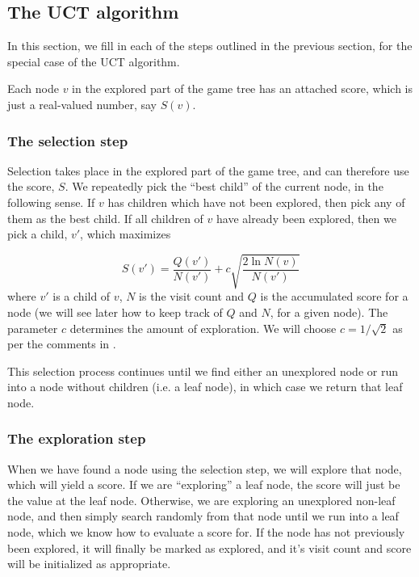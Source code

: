 \subsection{The UCT algorithm}
\label{sec:uct}

In this section, we fill in each of the steps outlined in the previous section, for the special case of the UCT algorithm.

Each node $v$ in the explored part of the game tree has an attached score, which is just a real-valued number, say $S(v)$.


\subsubsection{The selection step}
\label{subsec:uct_selection_step}

Selection takes place in the explored part of the game tree, and can therefore use the score, $S$.
We repeatedly pick the ``best child'' of the current node, in the following sense.
If $v$ has children which have not been explored, then pick any of them as the best child.
If all children of $v$ have already been explored, then we pick a child, $v'$, which maximizes

\begin{equation}
\label{eq:uctnodevalue}
S(v') = \frac{Q(v')}{N(v')} + c\sqrt{\frac{2\ln{N(v)}}{N(v')}}
\end{equation} 
where $v'$ is a child of $v$, $N$ is the visit count and $Q$ is the accumulated score for a node (we will see later how to keep track of $Q$ and $N$, for a given node).
The parameter $c$ determines the amount of exploration. We will choose $c = 1 / \sqrt 2$ as per the comments in \citep[p. 9]{mcts_survey12}.

This selection process continues until we find either an unexplored node or run into a node without children (i.e. a leaf node), in which case we return that leaf node.

\subsubsection{The exploration step}

When we have found a node using the selection step, we will explore that node, which will yield a score.
If we are ``exploring'' a leaf node, the score will just be the value at the leaf node.
Otherwise, we are exploring an unexplored non-leaf node, and then simply search randomly from that node until we run into a leaf node, which we know how to evaluate a score for.
If the node has not previously been explored, it will finally be marked as explored, and it's visit count and score will be initialized as appropriate.

